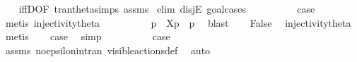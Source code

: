 \begin{isabellebody}
%
\isadelimproof
\ \ %
\endisadelimproof
%
\isatagproof
{}\isamarkupfalse%
\ iffD{}{\isacharbrackleft}{\kern0pt}OF\ tran{\isacharunderscore}{\kern0pt}theta{\isachardot}{\kern0pt}simps\ assms{\isacharparenleft}{\kern0pt}{}{\isacharparenright}{\kern0pt}{\isacharbrackright}{\kern0pt}\isanewline
{}\isamarkupfalse%
\ {\isacharparenleft}{\kern0pt}elim\ disjE{\isacharcomma}{\kern0pt}\ goal{\isacharunderscore}{\kern0pt}cases{\isacharparenright}{\kern0pt}\isanewline
\ \ \isamarkupfalse%
\ {}\isanewline
\ \ \isamarkupfalse%
\ \isamarkupfalse%
\ {\isacharquery}{\kern0pt}case\ \isamarkupfalse%
\ {\isacharparenleft}{\kern0pt}metis\ injectivity{\isacharunderscore}{\kern0pt}theta{\isacharparenleft}{\kern0pt}{}{\isacharparenright}{\kern0pt}{\isacharparenright}{\kern0pt}\isanewline
{}\isamarkupfalse%
\isanewline
\ \ \isamarkupfalse%
\ {}\isanewline
\ \ \isamarkupfalse%
\ \isamarkupfalse%
\ p{\isacharprime}{\kern0pt}\ \ {\isacartoucheopen}{\isasymtheta}{\isacharbrackleft}{\kern0pt}X{\isacharbrackright}{\kern0pt}{\isacharparenleft}{\kern0pt}p{\isacharparenright}{\kern0pt}\ {\isacharequal}{\kern0pt}\ {\isasymtheta}{\isacharparenleft}{\kern0pt}p{\isacharprime}{\kern0pt}{\isacharparenright}{\kern0pt}{\isacartoucheclose}\ \isamarkupfalse%
\ blast\isanewline
\ \ \isamarkupfalse%
\ False\ \isamarkupfalse%
\ injectivity{\isacharunderscore}{\kern0pt}theta{\isacharparenleft}{\kern0pt}{}{\isacharparenright}{\kern0pt}\ \isamarkupfalse%
\ metis\isanewline
\ \ \isamarkupfalse%
\ {\isacharquery}{\kern0pt}case\ \isamarkupfalse%
\ simp\isanewline
{}\isamarkupfalse%
\isanewline
\ \ \isamarkupfalse%
\ {}\isanewline
\ \ \isamarkupfalse%
\ \isamarkupfalse%
\ {\isacharquery}{\kern0pt}case\ \isamarkupfalse%
\ assms{\isacharparenleft}{\kern0pt}{}{\isacharparenright}{\kern0pt}\ no{\isacharunderscore}{\kern0pt}epsilon{\isacharunderscore}{\kern0pt}in{\isacharunderscore}{\kern0pt}tran{\isacharparenleft}{\kern0pt}{}{\isacharparenright}{\kern0pt}\ visible{\isacharunderscore}{\kern0pt}actions{\isacharunderscore}{\kern0pt}def\ \isamarkupfalse%
\ auto\isanewline
{}\isamarkupfalse%
\isanewline
\ \ \isamarkupfalse%

\end{isabellebody}
